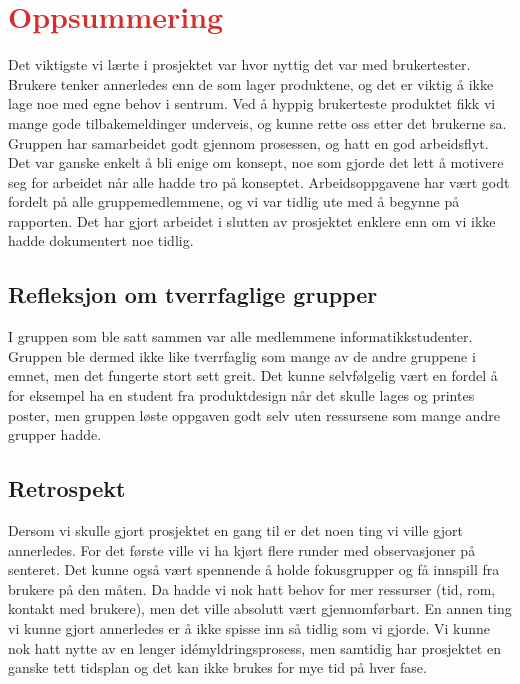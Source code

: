 \section{\textcolor[HTML]{D32F2F}{Oppsummering}}
\label{oppsummering}
Det viktigste vi lærte i prosjektet var hvor nyttig det var med brukertester.
Brukere tenker annerledes enn de som lager produktene, og det er viktig å ikke lage noe med egne behov i sentrum. Ved å hyppig brukerteste produktet fikk vi mange gode tilbakemeldinger underveis, og kunne rette oss etter det brukerne sa. 
Gruppen har samarbeidet godt gjennom prosessen, og hatt en god arbeidsflyt. Det var ganske enkelt å bli enige om konsept, noe som gjorde det lett å motivere seg for arbeidet når alle hadde tro på konseptet. Arbeidsoppgavene har vært godt fordelt på alle gruppemedlemmene, og vi var tidlig ute med å begynne på rapporten. Det har gjort arbeidet i slutten av prosjektet enklere enn om vi ikke hadde dokumentert noe tidlig.

\subsection{Refleksjon om tverrfaglige grupper}
I gruppen som ble satt sammen var alle medlemmene informatikkstudenter. Gruppen ble dermed ikke like tverrfaglig som mange av de andre gruppene i emnet, men det fungerte stort sett greit. Det kunne selvfølgelig vært en fordel å for eksempel ha en student fra produktdesign når det skulle lages og printes poster, men gruppen løste oppgaven godt selv uten ressursene som mange andre grupper hadde.

\subsection{Retrospekt}
Dersom vi skulle gjort prosjektet en gang til er det noen ting vi ville gjort annerledes. For det første ville vi ha kjørt flere runder med observasjoner på senteret. Det kunne også vært spennende å holde fokusgrupper og få innspill fra brukere på den måten. Da hadde vi nok hatt behov for mer ressurser (tid, rom, kontakt med brukere), men det ville absolutt vært gjennomførbart. En annen ting vi kunne gjort annerledes er å ikke spisse inn så tidlig som vi gjorde. Vi kunne nok hatt nytte av en lenger idémyldringsprosess, men samtidig har prosjektet en ganske tett tidsplan og det kan ikke brukes for mye tid på hver fase.

